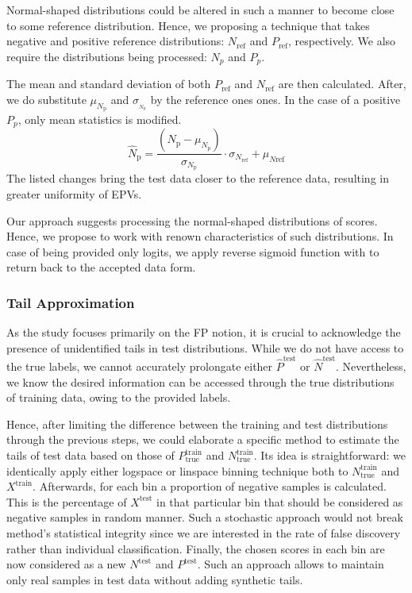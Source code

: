 \documentclass{article}
\begin{document}
Normal-shaped distributions could be altered in such a manner to become close to some reference distribution. Hence, we proposing a technique that takes negative and positive reference distributions: $N_{\text{ref}}$ and $P_{\text{ref}}$, respectively. We also require the distributions being processed: $N_p$ and $P_p$. 

The mean and standard deviation of both $P_{\text{ref}}$ and $N_{\text{ref}}$ are then calculated. After, we do substitute $\mu_{N_{\text{p}}}$ and $\sigma_{_N_{\text{p}}}$ by the reference ones ones. In the case of a positive $P_p$, only mean statistics is modified.
    \begin{equation}
            \hat{N}_{\text{p}} = \frac{(N_{\text{p}} - \mu_{N_{\text{p}}})}{\sigma_{N_{\text{p}}}} \cdot \sigma_{N_{\text{ref}}} + \mu_{N{\text{ref}}}
    \end{equation}
The listed changes bring the test data closer to the reference data, resulting in greater uniformity of EPVs.

Our approach suggests processing the normal-shaped distributions of scores. Hence, we propose to work with renown characteristics of such distributions. In case of being provided only logits, we apply reverse sigmoid function with to return back to the accepted data form.

\subsubsection{Tail Approximation}

As the study focuses primarily on the FP notion, it is crucial to acknowledge the presence of unidentified tails in test distributions. While we do not have access to the true labels, we cannot accurately prolongate either $\hat{P}^{\text{test}}$ or $ \hat{N}^{\text{test}}$. Nevertheless, we know the desired information can be accessed through the true distributions of training data, owing to the provided labels. 

Hence, after limiting the difference between the training and test distributions through the previous steps, we could elaborate a specific method to estimate the tails of test data based on those of $P^{\text{train}}_{\text{true}}$ and $N^{\text{train}}_{\text{true}}$. Its idea is straightforward: we identically apply either logspace or linspace binning technique both to $N^{\text{train}}_{\text{true}}$ and $X^\text{train}$. Afterwards, for each bin a proportion of negative samples is calculated. This is the percentage of $X^\text{test}$ in that particular bin that should be considered as negative samples in random manner. Such a stochastic approach would not break method's statistical integrity since we are interested in the rate of false discovery rather than individual classification. Finally, the chosen scores in each bin are now considered as a new $N^{\text{test}}$ and $P^{\text{test}}$. Such an approach allows to maintain only real samples in test data without adding synthetic tails.
\end{document}
